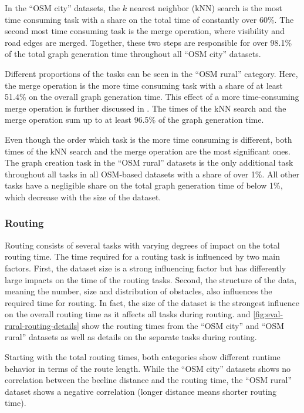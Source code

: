 			In the \enquote{OSM city} datasets, the $k$ nearest neighbor (kNN) search is the most time consuming task with a share on the total time of constantly over 60\%.
			The second most time consuming task is the merge operation, where visibility and road edges are merged.
			Together, these two steps are responsible for over 98.1\% of the total graph generation time throughout all \enquote{OSM city} datasets.
			
			Different proportions of the tasks can be seen in the \enquote{OSM rural} category.
			Here, the merge operation is the more time consuming task with a share of at least 51.4\% on the overall graph generation time.
			This effect of a more time-consuming merge operation is further discussed in .
			The times of the kNN search and the merge operation sum up to at least 96.5\% of the graph generation time.
			
			Even though the order which task is the more time consuming is different, both times of the kNN search and the merge operation are the most significant ones.
			The graph creation task in the \enquote{OSM rural} datasets is the only additional task throughout all tasks in all OSM-based datasets with a share of over 1\%.
			All other tasks have a negligible share on the total graph generation time of below 1\%, which decrease with the size of the dataset.
	
		\subsubsection{Routing}
		
			Routing consists of several tasks with varying degrees of impact on the total routing time.
			The time required for a routing task is influenced by two main factors.
			First, the dataset size is a strong influencing factor but has differently large impacts on the time of the routing tasks.
			Second, the structure of the data, meaning the number, size and distribution of obstacles, also influences the required time for routing.
			In fact, the size of the dataset is the strongest influence on the overall routing time as it affects all tasks during routing.
			 and \ref{fig:eval-rural-routing-details} show the routing times from the \enquote{OSM city} and \enquote{OSM rural} datasets as well as details on the separate tasks during routing.
			
			Starting with the total routing times, both categories show different runtime behavior in terms of the route length.
			While the \enquote{OSM city} datasets shows no correlation between the beeline distance and the routing time, the \enquote{OSM rural} dataset shows a negative correlation (longer distance means shorter routing time).
			
